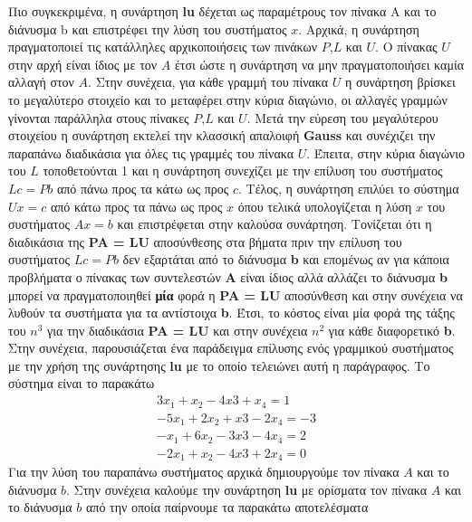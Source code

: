 \documentclass[First Project.tex]{subfiles}
\begin{document}
Πιο συγκεκριμένα, η συνάρτηση \textlatin{\textbf{lu}} δέχεται ως παραμέτρους τον πίνακα \textlatin{A} και το διάνυσμα \textlatin{b} και
επιστρέφει την λύση του συστήματος $x$. Αρχικά, η συνάρτηση πραγματοποιεί τις κατάλληλες αρχικοποιήσεις των πινάκων $P$,$L$ και $U$. Ο πίνακας
$U$ στην αρχή είναι ίδιος με τον $A$ έτσι ώστε η συνάρτηση να μην πραγματοποιήσει καμία αλλαγή στον $A$. Στην συνέχεια, για κάθε γραμμή του 
πίνακα $U$ η συνάρτηση βρίσκει το μεγαλύτερο στοιχείο και το μεταφέρει στην κύρια διαγώνιο, οι αλλαγές γραμμών γίνονται παράλληλα στους
πίνακες $P$,$L$ και $U$. Μετά την εύρεση του μεγαλύτερου στοιχείου η συνάρτηση εκτελεί την κλασσική απαλοιφή \textlatin{\textbf{Gauss}} και
συνέχιζει την παραπάνω διαδικάσια για όλες τις γραμμές του πίνακα $U$. Έπειτα, στην κύρια διαγώνιο του $L$ τοποθετούνται 1 και η συνάρτηση 
συνεχίζει με την επίλυση του συστήματος $Lc = Pb$ από πάνω προς τα κάτω ως προς $c$. Τέλος, η συνάρτηση επιλύει το σύστημα $Ux = c$ από κάτω
προς τα πάνω ως προς $x$ όπου τελικά υπολογίζεται η λύση $x$ του συστήματος $Ax = b$ και επιστρέφεται στην καλούσα συνάρτηση. Τονίζεται ότι
η διαδικάσια της \textlatin{\textbf{PA = LU}} αποσύνθεσης στα βήματα πριν την επίλυση του συστήματος $Lc = Pb$ δεν εξαρτάται από το διάνυσμα 
\textlatin{\textbf{b}} και επομένως αν για κάποια προβλήματα ο πίνακας των συντελεστών \textlatin{\textbf{A}} είναι ίδιος αλλά αλλάζει το 
διάνυσμα \textlatin{\textbf{b}} μπορεί να πραγματοποιηθεί \textbf{μία} φορά η \textlatin{\textbf{PA = LU}} αποσύνθεση και στην συνέχεια να
λυθούν τα συστήματα για τα αντίστοιχα \textlatin{\textbf{b}}. Έτσι, το κόστος είναι μία φορά της τάξης του $n^{3}$ για την διαδικάσια
\textlatin{\textbf{PA = LU}} και στην συνέχεια $n^{2}$ για κάθε διαφορετικό \textlatin{\textbf{b}}. Στην συνέχεια, παρουσιάζεται ένα παράδειγμα
επίλυσης ενός γραμμικού συστήματος με την χρήση της συνάρτησης \textlatin{\textbf{lu}} με το οποίο τελειώνει αυτή η παράγραφος. Το σύστημα είναι
το παρακάτω 
\begin{gather*}
    3x_{1} + x_{2} - 4x{3} + x_{4} = 1 \\
    -5x_{1} + 2x_{2} + x{3} - 2x_{4} = -3 \\
    -x_{1} + 6x_{2} - 3x{3} - 4x_{4} = 2 \\
    -2x_{1} + x_{2} - 4x{3} + 2x_{4} = 0
\end{gather*}
Για την λύση του παραπάνω συστήματος αρχικά δημιουργούμε τον πίνακα $A$ και το διάνυσμα $b$. Στην συνέχεια καλούμε την συνάρτηση 
\textlatin{\textbf{lu}} με ορίσματα τον πίνακα $Α$ και το διάνυσμα $b$ από την οποία παίρνουμε τα παρακάτω αποτελέσματα
\end{document}
